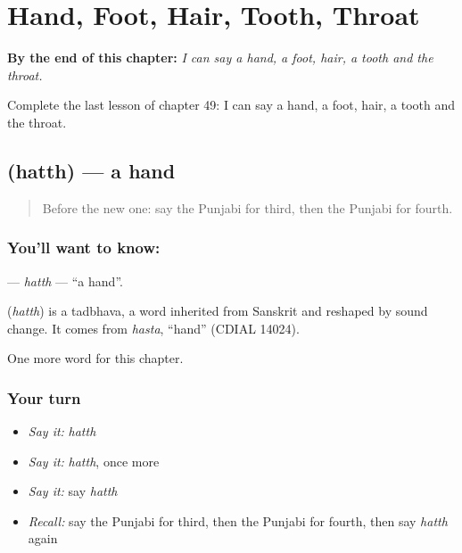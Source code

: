 
\chapter{Hand, Foot, Hair, Tooth, Throat}
\label{ch:pa-hand-foot-hair-tooth-throat}

\begin{chapteropening}
\textbf{By the end of this chapter:} \emph{I can say a hand, a foot, hair, a tooth and the throat.}

Complete the last lesson of chapter 49: I can say a hand, a foot, hair, a tooth and the throat.
\end{chapteropening}

\section[\texorpdfstring{\pa{ਹੱਥ} (hatth)}{ਹੱਥ (hatth)}]{ (hatth) — a hand}

\label{lesson:PA-C49-hatth}



\begin{quote}
Before the new one: say the Punjabi for third, then the Punjabi for fourth.
\end{quote}

\subsection*{You'll want to know: }
\textbf{} — \emph{hatth} — \textquotedblleft{}a hand\textquotedblright{}.

\begin{cousinweb}
\textbf{} (\emph{hatth}) is a tadbhava, a word inherited from Sanskrit and reshaped by sound change. It comes from \emph{hasta}, \textquotedblleft{}hand\textquotedblright{} (CDIAL 14024).
\end{cousinweb}

\begin{grammarlens}[title={What you've built}]
One more word for this chapter.
\end{grammarlens}

\subsection*{Your turn}
\begin{itemize}
\raggedright
  \item \emph{Say it:} \emph{hatth}
  \item \emph{Say it:} \emph{hatth}, once more
  \item \emph{Say it:} say \emph{hatth}
  \item \emph{Recall:} say the Punjabi for third, then the Punjabi for fourth, then say \emph{hatth} again
\end{itemize}

